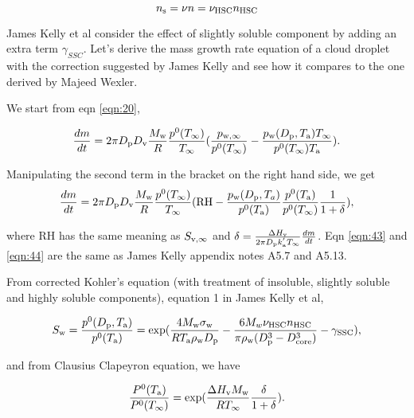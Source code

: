 \documentclass[12pt]{article}
\begin{document}
\begin{equation}\label{eqn:42}
n_{\rm s}=\nu n=\nu_{\rm HSC} n_{\rm HSC}
\end{equation}

James Kelly et al consider the effect of slightly soluble component by adding an extra term $\gamma_{SSC}$.  Let's derive the mass growth rate equation of a cloud droplet with the correction suggested by James Kelly and see how it compares to the one derived by Majeed Wexler.

We start from eqn \ref{eqn:20}, 

\begin{equation}\label{eqn:43}
\frac{dm}{dt}=2 \pi D_{\rm p} D_{\rm v} \frac{M_{\rm w}}{R}  \frac{p^{\rm 0}(T_{\infty})} {T_{\infty}} (\frac{p_{\rm w, \infty}}{p^{0}(T_{\infty})} - \frac{p_{\rm w}(D_{\rm p}, T_{\rm a}) T_{\infty}}{p^{\rm 0}(T_{\infty}) T_{\rm a}}).
\end{equation}

Manipulating the second term in the bracket on the right hand side, we get
\begin{equation}\label{eqn:44}
\frac{dm}{dt}=2 \pi D_{\rm p} D_{\rm v}  \frac{M_{\rm w}}{R} \frac{p^{\rm 0}(T_{\infty})} {T_{\infty}} (\textrm{RH} - \frac{p_{\rm w}(D_{\rm p}, T_{a})}{p^{\rm 0}(T_{\rm a})} \frac{p^{\rm 0}(T_{\rm a})}{p^{\rm 0}(T_{\infty})}\frac{1}{1+\delta}),
\end{equation}

where RH has the same meaning as $S_{\rm v, \infty}$ and $\delta=\frac{\Delta H_{\rm v}}{2 \pi D_{\rm p} k^{'}_{\rm a} T_{\infty}} \frac{dm}{dt}$. Eqn \ref{eqn:43} and \ref{eqn:44} are the same as James Kelly appendix notes A5.7 and A5.13.

From corrected Kohler's  equation (with treatment of insoluble, slightly soluble and highly soluble components), equation 1  in James Kelly et al, 

\begin{equation}\label{eqn:45}
S_{\rm w}=\frac{p^{\rm 0}(D_{\rm p} ,T_{\rm a})} {p^{\rm 0}(T_{\rm a})} =\exp(\frac{4M_{\rm w}\sigma_{\rm w}}{RT_{\rm a}\rho_{\rm w}D_{\rm p}}-\frac{6M_{w}\nu_{\rm HSC}n_{\rm HSC}}{\pi \rho_{\rm w} (D_{\rm p}^{3}-D_{\rm core}^{3})}-\gamma_{\rm SSC}),
\end{equation}

and from Clausius Clapeyron equation, we have

\begin{equation}\label{eqn:46}
\frac{P^{\rm 0}(T_{\rm a})}{P^{\rm 0}(T_{\infty})}=\exp (\frac{\Delta H_{\rm v} M_{\rm w}}{R T_{\infty}} \frac{\delta}{1+\delta}).
\end{equation}
  
\end{document}

